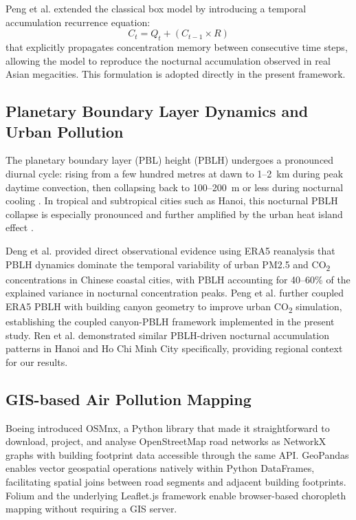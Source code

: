 \documentclass[12pt,a4paper]{article}
\begin{document}
Peng et al. \cite{Peng2023} extended the classical box model by introducing a temporal accumulation recurrence equation:
\begin{equation}
  C_t = Q_t + (C_{t-1} \times R)
  \label{eq:boxmodel}
\end{equation}
that explicitly propagates concentration memory between consecutive time steps, allowing the model to reproduce the nocturnal accumulation observed in real Asian megacities. This formulation is adopted directly in the present framework.

\subsection{Planetary Boundary Layer Dynamics and Urban Pollution}

The planetary boundary layer (PBL) height (PBLH) undergoes a pronounced diurnal cycle: rising from a few hundred metres at dawn to 1--2~km during peak daytime convection, then collapsing back to 100--200~m or less during nocturnal cooling \cite{Stull1988,Seibert2000}. In tropical and subtropical cities such as Hanoi, this nocturnal PBLH collapse is especially pronounced and further amplified by the urban heat island effect \cite{He2019,Zhong2021}.

Deng et al. \cite{Deng2023} provided direct observational evidence using ERA5 reanalysis that PBLH dynamics dominate the temporal variability of urban PM2.5 and CO\textsubscript{2} concentrations in Chinese coastal cities, with PBLH accounting for 40--60\% of the explained variance in nocturnal concentration peaks. Peng et al. \cite{Peng2023} further coupled ERA5 PBLH with building canyon geometry to improve urban CO\textsubscript{2} simulation, establishing the coupled canyon-PBLH framework implemented in the present study. Ren et al. \cite{Ren2021} demonstrated similar PBLH-driven nocturnal accumulation patterns in Hanoi and Ho Chi Minh City specifically, providing regional context for our results.

\subsection{GIS-based Air Pollution Mapping}

Boeing \cite{Boeing2017} introduced OSMnx, a Python library that made it straightforward to download, project, and analyse OpenStreetMap road networks as NetworkX graphs with building footprint data accessible through the same API. GeoPandas \cite{Jordahl2021} enables vector geospatial operations natively within Python DataFrames, facilitating spatial joins between road segments and adjacent building footprints. Folium and the underlying Leaflet.js framework enable browser-based choropleth mapping without requiring a GIS server.
\end{document}
